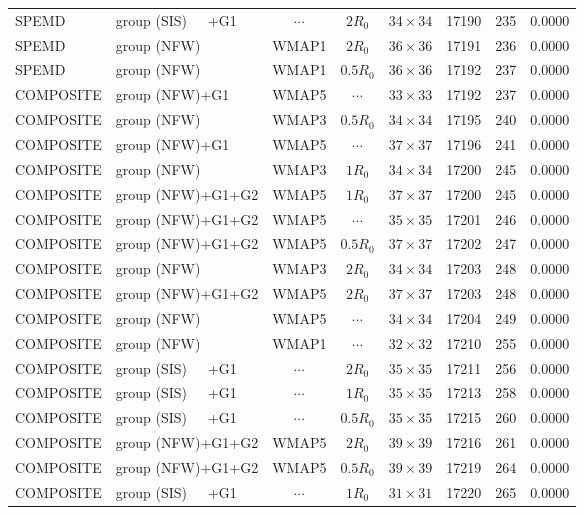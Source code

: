 \documentclass[useAMS,usenatbib]{mnras}
\def\nomicro{$\cdots$}
\def\nodata{$\cdots$}
\begin{document}
\begin{table}
\begin{tabular}{llccccrr}
        SPEMD     & group (SIS)~~~+G1 &\nodata& $2R_{0}$&$34\times34$  & 17190 & 235 & 0.0000\\
        SPEMD     & group (NFW)       &WMAP1 & $2R_{0}$&$36\times36$   & 17191 & 236 & 0.0000\\
        SPEMD     & group (NFW)       &WMAP1 & $0.5R_{0}$&$36\times36$ & 17192 & 237 & 0.0000\\
        COMPOSITE & group (NFW)+G1    &WMAP5 & \nomicro&$33\times33$   & 17192 & 237 & 0.0000\\
        COMPOSITE & group (NFW)       &WMAP3 & $0.5R_{0}$&$34\times34$ & 17195 & 240 & 0.0000\\
        COMPOSITE & group (NFW)+G1    &WMAP5 & \nomicro&$37\times37$   & 17196 & 241 & 0.0000\\
        COMPOSITE & group (NFW)       &WMAP3 & $1R_{0}$&$34\times34$   & 17200 & 245 & 0.0000\\
        COMPOSITE & group (NFW)+G1+G2 &WMAP5 & $1R_{0}$&$37\times37$   & 17200 & 245 & 0.0000\\
        COMPOSITE & group (NFW)+G1+G2 &WMAP5 & \nomicro&$35\times35$   & 17201 & 246 & 0.0000\\
        COMPOSITE & group (NFW)+G1+G2 &WMAP5 & $0.5R_{0}$&$37\times37$ & 17202 & 247 & 0.0000\\
        COMPOSITE & group (NFW)       &WMAP3 & $2R_{0}$&$34\times34$   & 17203 & 248 & 0.0000\\
        COMPOSITE & group (NFW)+G1+G2 &WMAP5 & $2R_{0}$&$37\times37$   & 17203 & 248 & 0.0000\\
        COMPOSITE & group (NFW)       &WMAP5 & \nomicro&$34\times34$   & 17204 & 249 & 0.0000\\
        COMPOSITE & group (NFW)       &WMAP1 & \nomicro&$32\times32$   & 17210 & 255 & 0.0000\\
        COMPOSITE & group (SIS)~~~+G1 &\nodata   & $2R_{0}$&$35\times35$ & 17211 & 256 & 0.0000\\
        COMPOSITE & group (SIS)~~~+G1 &\nodata   & $1R_{0}$&$35\times35$ & 17213 & 258 & 0.0000\\
        COMPOSITE & group (SIS)~~~+G1 &\nodata   & $0.5R_{0}$&$35\times35$ & 17215 & 260 & 0.0000\\
        COMPOSITE & group (NFW)+G1+G2 &WMAP5 & $2R_{0}$&$39\times39$ & 17216 & 261 & 0.0000\\
        COMPOSITE & group (NFW)+G1+G2 &WMAP5 & $0.5R_{0}$&$39\times39$ & 17219 & 264 & 0.0000\\
        COMPOSITE & group (SIS)~~~+G1 &\nodata & $1R_{0}$&$31\times31$ & 17220 & 265 & 0.0000\\

\end{tabular}
\end{table}
\end{document}
